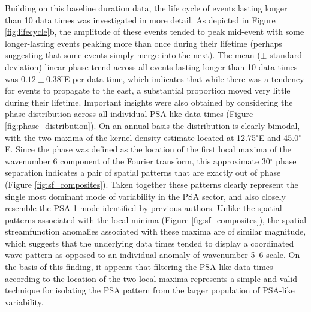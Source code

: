 Building on this baseline duration data, the life cycle of events lasting longer than 10 data times was investigated in more detail. As depicted in Figure \ref{fig:lifecycle}b, the amplitude of these events tended to peak mid-event with some longer-lasting events peaking more than once during their lifetime (perhaps suggesting that some events simply merge into the next). The mean ($\pm$ standard deviation) linear phase trend across all events lasting longer than 10 data times was $0.12 \pm 0.38^{\circ}$E per data time, which indicates that while there was a tendency for events to propagate to the east, a substantial proportion moved very little during their lifetime. Important insights were also obtained by considering the phase distribution across all individual PSA-like data times (Figure \ref{fig:phase_distribution}). On an annual basis the distribution is clearly bimodal, with the two maxima of the kernel density estimate located at 12.75$^{\circ}$E and 45.0$^{\circ}$E. Since the phase was defined as the location of the first local maxima of the wavenumber 6 component of the Fourier transform, this approximate 30$^{\circ}$ phase separation indicates a pair of spatial patterns that are exactly out of phase (Figure \ref{fig:sf_composites}). Taken together these patterns clearly represent the single most dominant mode of variability in the PSA sector, and also closely resemble the PSA-1 mode identified by previous authors. Unlike the spatial patterns associated with the local minima (Figure \ref{fig:sf_composites}), the spatial streamfunction anomalies associated with these maxima are of similar magnitude, which suggests that the underlying data times tended to display a coordinated wave pattern as opposed to an individual anomaly of wavenumber 5--6 scale. On the basis of this finding, it appears that filtering the PSA-like data times according to the location of the two local maxima represents a simple and valid technique for isolating the PSA pattern from the larger population of PSA-like variability. 


